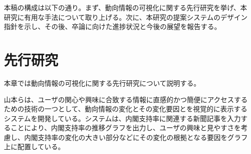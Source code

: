 \documentclass{matsushita-zemi}
\begin{document}

本稿の構成は以下の通り。まず、動向情報の可視化に関する先行研究を挙げ、本研究に有用な手法について取り上げる。次に、本研究の提案システムのデザイン指針を示し、その後、卒論に向けた進捗状況と今後の展望を報告する。

\section{先行研究}
\label{relatedworks} 
本章では動向情報の可視化に関する先行研究について説明する。

山本らは、ユーザの関心や興味に合致する情報に直感的かつ簡便にアクセスするための技術の一つとして、動向情報の変化とその変化要因とを視覚的に表示するシステムを開発している\cite{Tagged_corpus}。システムは、内閣支持率に関連する新聞記事を入力することにより、内閣支持率の推移グラフを出力し、ユーザの興味と見やすさを考慮し、内閣支持率の変化の大きい部分などにその変化の根拠となる要因をグラフ上に配置している。

\end{document}

